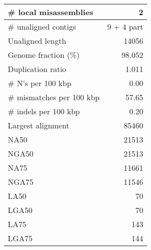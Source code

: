\documentclass[12pt,a4paper]{article}
\begin{document}
\begin{table}[ht]
\begin{center}
\begin{tabular}{|l*{1}{|r}|}
\# local misassemblies & 2 \\ \hline
\# unaligned contigs & 9 + 4 part \\ \hline
Unaligned length & 14056 \\ \hline
Genome fraction (\%) & 98.052 \\ \hline
Duplication ratio & 1.011 \\ \hline
\# N's per 100 kbp & 0.00 \\ \hline
\# mismatches per 100 kbp & 57.65 \\ \hline
\# indels per 100 kbp & 0.20 \\ \hline
Largest alignment & 85460 \\ \hline
NA50 & 21513 \\ \hline
NGA50 & 21513 \\ \hline
NA75 & 11661 \\ \hline
NGA75 & 11546 \\ \hline
LA50 & 70 \\ \hline
LGA50 & 70 \\ \hline
LA75 & 143 \\ \hline
LGA75 & 144 \\ \hline
\end{tabular}
\end{center}
\end{table}
\end{document}
